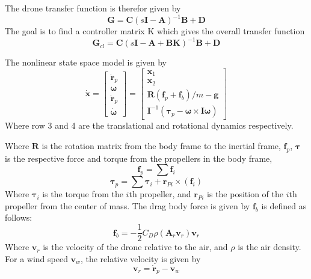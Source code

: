 \documentclass{article}
\begin{document}
The drone transfer function is therefor given by
\begin{equation}
    \mathbf{G} = \mathbf{C} (s\mathbf{I} - \mathbf{A})^{-1} \mathbf{B} + \mathbf{D}
\end{equation}
The goal is to find a controller matrix K which gives the overall transfer function
\begin{equation}
    \mathbf{G}_{cl} = \mathbf{C} (s\mathbf{I} - \mathbf{A} + \mathbf{BK})^{-1} \mathbf{B} + \mathbf{D}
\end{equation}


The nonlinear state space model is given by
\begin{equation}
    \mathbf{\dot{x}} = \begin{bmatrix}
        \mathbf{\dot{r}}_p \\
        \boldsymbol{\omega} \\
        \mathbf{\dot{r}}_p \\
        \boldsymbol{\dot{\omega}}
    \end{bmatrix} = \begin{bmatrix}
        \mathbf{x}_1 \\
        \mathbf{x}_2 \\
        \mathbf{R}(\mathbf{f}_p + \mathbf{f}_b) / m - \mathbf{g} \\
        \mathbf{I}^{-1} (\boldsymbol{\tau}_p - \boldsymbol{\omega} \times \mathbf{I} \boldsymbol{\omega})
    \end{bmatrix}
\end{equation}
Where row 3 and 4 are the translational and rotational dynamics respectively.

Where $\mathbf{R}$ is the rotation matrix from the body frame to the inertial frame,
$\mathbf{f}_p$, $\boldsymbol{\tau}$ is the respective force and torque from the propellers in the body frame,
\begin{equation}
    \mathbf{f}_p = \sum{\mathbf{f}_i}
\end{equation}
\begin{equation}
    \boldsymbol{\tau}_p = \sum{\boldsymbol{\tau}_i + \mathbf{r}_{Pi} \times (\mathbf{f}_i)}
\end{equation}
Where $\boldsymbol{\tau}_i$ is the torque from the $i$th propeller, and $\mathbf{r}_{Pi}$ is the position of the $i$th propeller from the center of mass.
The drag body force is given by $\mathbf{f}_b$ is defined as follows:
\begin{equation}
    \mathbf{f}_b = -\frac{1}{2} C_D \rho (\mathbf{A}_r \mathbf{v}_r ) \mathbf{v}_r
\end{equation}
Where $\mathbf{v}_r$ is the velocity of the drone relative to the air, and $\rho$ is the air density.
For a wind speed $\mathbf{v}_w$, the relative velocity is given by
\begin{equation}
    \mathbf{v}_r = \mathbf{\dot{r}}_p - \mathbf{v}_w
\end{equation}
\end{document}
